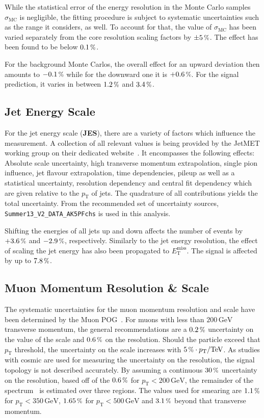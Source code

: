 While the statistical error of the energy resolution in the Monte Carlo samples $\sigma_{\text{MC}}$ is negligible, the fitting procedure is subject to systematic uncertainties such as the range it considers, as well. To account for that, the value of $\sigma_{\text{MC}}$ has been varied separately from the core resolution scaling factors by $\pm 5\,\pct$. The effect has been found to be below $0.1\,\pct$.

For the background Monte Carlos, the overall effect for an upward deviation then amounts to $-0.1\,\pct$ while for the downward one it is $+0.6\,\pct$. For the signal prediction, it varies in between $1.2\,\pct$ and $3.4\,\pct$.


\subsection{Jet Energy Scale}
\label{sec:jes}

For the jet energy scale (\textbf{JES}), there are a variety of factors which influence the measurement. A collection of all relevant values is being provided by the JetMET working group on their dedicated website~\cite{jes}. It encompasses the following effects: Absolute scale uncertainty, high transverse momentum extrapolation, single pion influence, jet flavour extrapolation, time dependencies, pileup as well as a statistical uncertainty, resolution dependency and central fit dependency which are given relative to the $p_{\text{T}}$ of jets. The quadrature of all contributions yields the total uncertainty. From the recommended set of uncertainty sources, \verb+Summer13_V2_DATA_AK5PFchs+ is used in this analysis. 

Shifting the energies of all jets up and down affects the number of events by $+3.6\,\pct$ and $-2.9\,\pct$, respectively. Similarly to the jet energy resolution, the effect of scaling the jet energy has also been propagated to $E_{\text{T}}^{\text{miss}}$. The signal is affected by up to $7.8\,\pct$.


\subsection{Muon Momentum Resolution \& Scale}
\label{sec:mers}

The systematic uncertainties for the muon momentum resolution and scale have been determined by the Muon POG~\cite{muonid2}. For muons with less than $200\,\text{GeV}$ transverse momentum, the general recommendations are a $0.2\,\pct$ uncertainty on the value of the scale and $0.6\,\pct$ on the resolution. Should the particle exceed that $p_{\text{T}}$ threshold, the uncertainty on the scale increases with $5\,\pct \cdot p_{\text{T}}/\text{TeV}$. As studies with cosmic are used for measuring the uncertainty on the resolution, the signal topology is not described accurately. By assuming a continuous $30\,\pct$ uncertainty on the resolution, based off of the $0.6\,\pct$ for $p_{\text{T}} < 200\,\text{GeV}$, the remainder of the spectrum~\cite{muonptscale} is estimated over three regions. The values used for smearing are $1.1\,\pct$ for $p_{\text{T}} < 350\,\text{GeV}$, $1.65\,\pct$ for $p_{\text{T}} < 500\,\text{GeV}$ and $3.1\,\pct$ beyond that transverse momentum.

